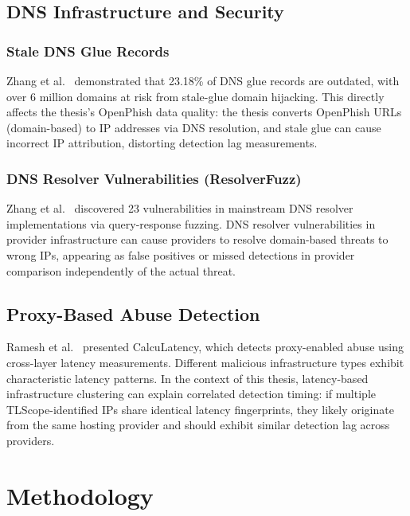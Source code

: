 \documentclass[12pt, a4paper, twoside]{report}
\begin{document}
\section{DNS Infrastructure and Security}

\subsection{Stale DNS Glue Records}

Zhang et al.\ \cite{zhang2024staleglue} demonstrated that 23.18\% of DNS glue records are
outdated, with over 6 million domains at risk from stale-glue domain hijacking. This directly
affects the thesis's OpenPhish data quality: the thesis converts OpenPhish URLs (domain-based) to
IP addresses via DNS resolution, and stale glue can cause incorrect IP attribution, distorting
detection lag measurements.

\subsection{DNS Resolver Vulnerabilities (ResolverFuzz)}

Zhang et al.\ \cite{zhang2024resolverfuzz} discovered 23 vulnerabilities in mainstream DNS
resolver implementations via query-response fuzzing. DNS resolver vulnerabilities in provider
infrastructure can cause providers to resolve domain-based threats to wrong IPs, appearing as
false positives or missed detections in provider comparison independently of the actual threat.

\section{Proxy-Based Abuse Detection}

Ramesh et al.\ \cite{ramesh2024calcuLatency} presented CalcuLatency, which detects proxy-enabled
abuse using cross-layer latency measurements. Different malicious infrastructure types exhibit
characteristic latency patterns. In the context of this thesis, latency-based infrastructure
clustering can explain correlated detection timing: if multiple TLScope-identified IPs share
identical latency fingerprints, they likely originate from the same hosting provider and should
exhibit similar detection lag across providers.

\chapter{Methodology}
\label{ch:methodology}
\end{document}
